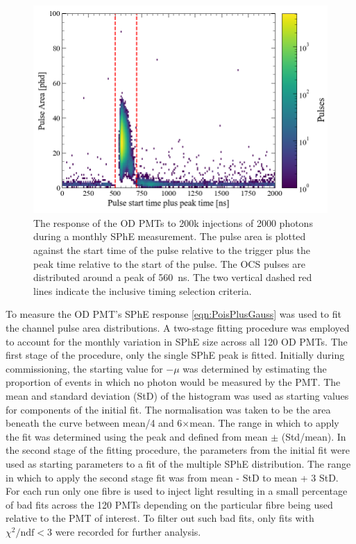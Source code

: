 \begin{figure}[ht!]
    \centering
    \includegraphics[width=0.8\linewidth]{figures/ODCommissioning/TimingVsPulseArea_2us.png}
    \caption{The response of the OD PMTs to 200k injections of 2000 photons during a monthly SPhE measurement. The pulse area is plotted against the start time of the pulse relative to the trigger plus the peak time relative to the start of the pulse. The OCS pulses are distributed around a peak of 560~ns. The two vertical dashed red lines indicate the inclusive timing selection criteria.}
    \label{fig:ODSPhE_TimingSelection}
\end{figure}

To measure the OD PMT's SPhE response \autoref{eqn:PoisPlusGauss} was used to fit the channel pulse area distributions. A two-stage fitting procedure was employed to account for the monthly variation in SPhE size across all 120 OD PMTs. The first stage of the procedure, only the single SPhE peak is fitted. Initially during commissioning, the starting value for $-\mu$ was determined by estimating the proportion of events in which no photon would be measured by the PMT. The mean and standard deviation (StD) of the histogram was used as starting values for components of the initial fit. The normalisation was taken to be the area beneath the curve between mean/4 and 6$\times$mean. The range in which to apply the fit was determined using the peak and defined from mean $\pm$ (Std/mean). In the second stage of the fitting procedure, the parameters from the initial fit were used as starting parameters to a fit of the multiple SPhE distribution. The range in which to apply the second stage fit was from mean - StD to mean + 3 StD. For each run only one fibre is used to inject light resulting in a small percentage of bad fits across the 120 PMTs depending on the particular fibre being used relative to the PMT of interest. To filter out such bad fits, only fits with $\chi^2/\text{ndf}<3$ were recorded for further analysis.

